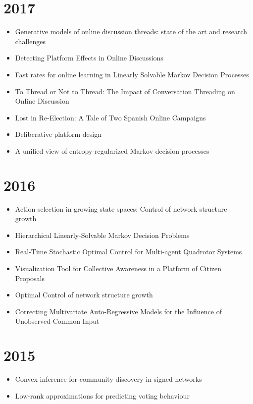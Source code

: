 \documentclass{article}
\begin{document}
\section*{2017}
\begin{itemize}
\item Generative models of online discussion threads: state of the art and research challenges~\cite{AragonJISA2017}
\item Detecting Platform Effects in Online Discussions~\cite{POI3:POI3158}
\item Fast rates for online learning in Linearly Solvable Markov Decision Processes~\cite{neu17a}
\item To Thread or Not to Thread: The Impact of Conversation Threading on Online Discussion~\cite{icwsm2017}
\item Lost in Re-Election: A Tale of Two Spanish Online Campaigns~\cite{Gallego2017}
\item Deliberative platform design~\cite{AragonDecidim2017}
\item A unified view of entropy-regularized Markov decision processes~\cite{neuDRL17}
\end{itemize}

\section*{2016}
\begin{itemize}
\item Action selection in growing state spaces: Control of network structure growth~\cite{klnetwork}
\item Hierarchical Linearly-Solvable Markov Decision Problems~\cite{hierarchical_lmdps}
\item Real-Time Stochastic Optimal Control for Multi-agent Quadrotor Systems~\cite{pi_uavs}
\item Visualization Tool for Collective Awareness in a Platform of Citizen Proposals~\cite{ICWSM1613046}
\item Optimal Control of network structure growth~\cite{dominiknips}
\item Correcting Multivariate Auto-Regressive Models for the Influence of Unobserved Common Input~\cite{gomez_ccia16}
\end{itemize}

\section*{2015}

\begin{itemize}
\item Convex inference for community discovery in signed networks~\cite{santamaria2015}
\item Low-rank approximations for predicting voting behaviour~\cite{porco2015}
\end{itemize}
\end{document}
